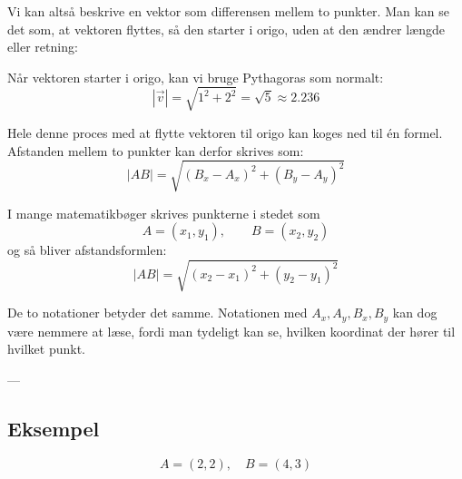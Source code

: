 Vi kan altså beskrive en vektor som differensen mellem to punkter. Man kan se det som, at vektoren flyttes, så den starter i origo, uden at den ændrer længde eller retning:

\begin{figure}[H]
    \centering
\end{figure}

Når vektoren starter i origo, kan vi bruge Pythagoras som normalt:
\[
|\vec{v}| = \sqrt{1^2+2^2} = \sqrt{5} \approx 2.236
\]

Hele denne proces med at flytte vektoren til origo kan koges ned til én formel. Afstanden mellem to punkter kan derfor skrives som:
\[
|AB| = \sqrt{(B_x-A_x)^2 + (B_y-A_y)^2}
\]

I mange matematikbøger skrives punkterne i stedet som
\[
A=(x_1,y_1), \qquad B=(x_2,y_2)
\]
og så bliver afstandsformlen:
\[
|AB| = \sqrt{(x_2-x_1)^2 + (y_2-y_1)^2}
\]

De to notationer betyder det samme. Notationen med $A_x, A_y, B_x, B_y$ kan dog være nemmere at læse, fordi man tydeligt kan se, hvilken koordinat der hører til hvilket punkt.

---

\subsection{Eksempel}
\[
A = (2,2), \quad B = (4,3)
\]


